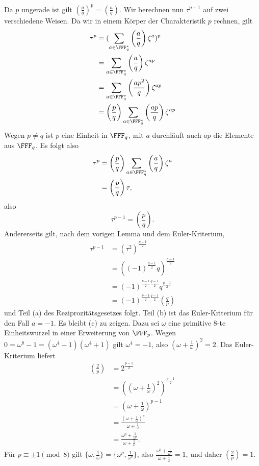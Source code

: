 \documentclass[12pt,a4paper,twoside]{article}
\begin{document}
Da $p$ ungerade ist gilt
$\left(\frac{a}{q}\right)^p=\left(\frac{a}{q}\right)$. Wir berechnen nun
$\tau^{p-1}$ auf zwei verschiedene Weisen. Da wir in einem K\"orper der
Charakteristik $p$ rechnen, gilt
\begin{align*}
  \tau^p &= (\sum_{a\in\FFF_q^\star}\left(\frac{a}{q}\right)\zeta^a)^p\\
&= \sum_{a\in\FFF_q^\star}\left(\frac{a}{q}\right)\zeta^{ap}\\
&= \sum_{a\in\FFF_q^\star}\left(\frac{ap^2}{q}\right)\zeta^{ap}\\
&= \left(\frac{p}{q}\right)\sum_{a\in\FFF_q^\star}
\left(\frac{ap}{q}\right)\zeta^{ap}
\end{align*}
Wegen $p\ne q$ ist $p$ eine Einheit in $\FFF_q$, mit $a$ durchl\"auft auch
$ap$ die Elemente aus $\FFF_q$. Es folgt also
\begin{align*}
  \tau^p &= \left(\frac{p}{q}\right)\sum_{a\in\FFF_q^\star}
\left(\frac{a}{q}\right)\zeta^{a}\\
&= \left(\frac{p}{q}\right)\tau,
\end{align*}
also
\[
\tau^{p-1}=\left(\frac{p}{q}\right).
\]
Andererseits gilt, nach dem vorigen Lemma und dem Euler-Kriterium,
\begin{align*}
  \tau^{p-1} &=
(\tau^2)^{\frac{p-1}{2}}\\
&= ((-1)^{\frac{q-1}{2}}q)^{\frac{p-1}{2}}\\
&= (-1)^{\frac{p-1}{2}\frac{q-1}{2}}q^{\frac{p-1}{2}}\\
&= (-1)^{\frac{p-1}{2}\frac{q-1}{2}}\left(\frac{q}{p}\right)
\end{align*}
und Teil (a) des Reziprozit\"atsgesetzes folgt. Teil (b) ist das
Euler-Kriterium f\"ur den Fall $a=-1$. Es bleibt (c) zu zeigen. Dazu sei
$\omega$ eine primitive $8$-te Einheitswurzel in einer Erweiterung von
$\FFF_p$. Wegen $0=\omega^8-1=(\omega^4-1)(\omega^4+1)$ gilt $\omega^4=-1$,
also $(\omega+\frac{1}{\omega})^2=2$. Das Euler-Kriterium liefert
\begin{align*}
  \left(\frac{2}{p}\right) &= 2^{\frac{p-1}{2}}\\
&= ((\omega+\frac{1}{\omega})^2)^{\frac{p-1}{2}}\\
&= (\omega+\frac{1}{\omega})^{p-1}\\
&= \frac{(\omega+\frac{1}{\omega})^p}{\omega+\frac{1}{\omega}}\\
&= \frac{\omega^p+\frac{1}{\omega^p}}{\omega+\frac{1}{\omega}}.
\end{align*}
F\"ur $p\equiv\pm1\pmod{8}$ gilt
$\{\omega,\frac{1}{\omega}\}=\{\omega^p,\frac{1}{\omega^p}\}$, also
$\frac{\omega^p+\frac{1}{\omega^p}}{\omega+\frac{1}{\omega}}=1$, und daher
  $\left(\frac{2}{p}\right)=1$.
\end{document}
